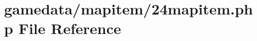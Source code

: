 \hypertarget{24mapitem_8php}{\section{gamedata/mapitem/24mapitem.php File Reference}
\label{24mapitem_8php}
}
